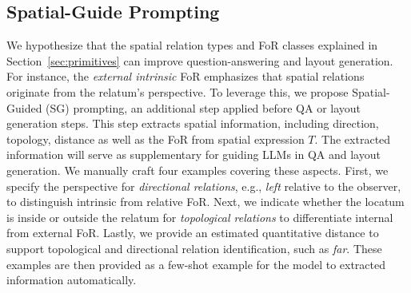 \subsection{Spatial-Guide Prompting}\label{sec:SG_prompting}
We hypothesize that the spatial relation types and FoR classes explained in Section~\ref{sec:primitives} can improve question-answering and layout generation.
For instance, the \textit{external intrinsic} FoR emphasizes that spatial relations originate from the relatum’s perspective.
To leverage this, we propose Spatial-Guided (SG) prompting, an additional step applied before QA or layout generation steps.
This step extracts spatial information, including direction, topology, distance as well as the FoR from spatial expression $T$. The extracted information will serve as supplementary for guiding LLMs in QA and layout generation.
We manually craft four examples covering these aspects.
First, we specify the perspective for \textit{directional relations}, e.g., \textit{left} relative to the observer, to distinguish intrinsic from relative FoR.
Next, we indicate whether the locatum is inside or outside the relatum for \textit{topological relations} to differentiate internal from external FoR.
Lastly, we provide an estimated quantitative distance to support topological and directional relation identification, such as \textit{far}.
These examples are then provided as a few-shot example for the model to extracted information automatically.
